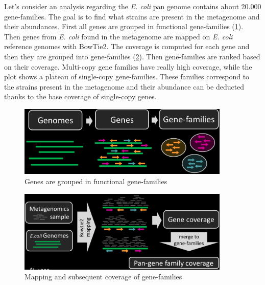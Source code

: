     Let's consider an analysis regarding the \emph{E. coli} pan genome contains about 20.000 gene-families.
    The goal is to find what strains are present in the metagenome and their abundances.
    First all genes are grouped in functional gene-families (\ref{fig:pan1}).
    Then genes from \emph{E. coli} found in the metagenome are mapped on \emph{E. coli} reference genomes with BowTie2.
    The coverage is computed for each gene and then they are grouped into gene-families (\ref{fig:pan2}).
    Then gene-families are ranked based on their coverage.
    Multi-copy gene families have really high coverage, while the plot shows a plateau of single-copy gene-families.
    These families correspond to the strains present in the metagenome and their abundance can be deducted thanks to the base coverage of single-copy genes.

    \begin{figure}[!h]
    \centering
    \includegraphics[width=0.9\textwidth]{panphlan1.png}
    \caption{\label{fig:pan1}Genes are grouped in functional gene-families}
    \end{figure}

    \begin{figure}[!h]
    \centering
    \includegraphics[width=0.9\textwidth]{panphlan2.png}
    \caption{\label{fig:pan2}Mapping and subsequent coverage of gene-families}
    \end{figure}

